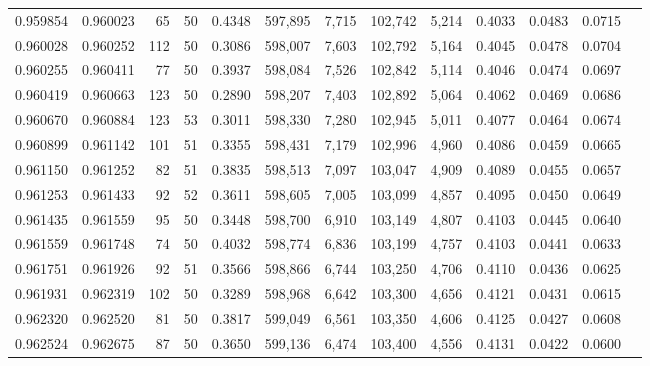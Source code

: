 \begin{tabular}{rrrrrrrrrrrrr}
0.959854 & 0.960023 &    65 &  50 &                                     0.4348 & 597,895 &   7,715 & 102,742 &   5,214 & 0.4033 & 0.0483 & 0.0715 \\
0.960028 & 0.960252 &   112 &  50 &                                     0.3086 & 598,007 &   7,603 & 102,792 &   5,164 & 0.4045 & 0.0478 & 0.0704 \\
0.960255 & 0.960411 &    77 &  50 &                                     0.3937 & 598,084 &   7,526 & 102,842 &   5,114 & 0.4046 & 0.0474 & 0.0697 \\
0.960419 & 0.960663 &   123 &  50 &                                     0.2890 & 598,207 &   7,403 & 102,892 &   5,064 & 0.4062 & 0.0469 & 0.0686 \\
0.960670 & 0.960884 &   123 &  53 &                                     0.3011 & 598,330 &   7,280 & 102,945 &   5,011 & 0.4077 & 0.0464 & 0.0674 \\
0.960899 & 0.961142 &   101 &  51 &                                     0.3355 & 598,431 &   7,179 & 102,996 &   4,960 & 0.4086 & 0.0459 & 0.0665 \\
0.961150 & 0.961252 &    82 &  51 &                                     0.3835 & 598,513 &   7,097 & 103,047 &   4,909 & 0.4089 & 0.0455 & 0.0657 \\
0.961253 & 0.961433 &    92 &  52 &                                     0.3611 & 598,605 &   7,005 & 103,099 &   4,857 & 0.4095 & 0.0450 & 0.0649 \\
0.961435 & 0.961559 &    95 &  50 &                                     0.3448 & 598,700 &   6,910 & 103,149 &   4,807 & 0.4103 & 0.0445 & 0.0640 \\
0.961559 & 0.961748 &    74 &  50 &                                     0.4032 & 598,774 &   6,836 & 103,199 &   4,757 & 0.4103 & 0.0441 & 0.0633 \\
0.961751 & 0.961926 &    92 &  51 &                                     0.3566 & 598,866 &   6,744 & 103,250 &   4,706 & 0.4110 & 0.0436 & 0.0625 \\
0.961931 & 0.962319 &   102 &  50 &                                     0.3289 & 598,968 &   6,642 & 103,300 &   4,656 & 0.4121 & 0.0431 & 0.0615 \\
0.962320 & 0.962520 &    81 &  50 &                                     0.3817 & 599,049 &   6,561 & 103,350 &   4,606 & 0.4125 & 0.0427 & 0.0608 \\
0.962524 & 0.962675 &    87 &  50 &                                     0.3650 & 599,136 &   6,474 & 103,400 &   4,556 & 0.4131 & 0.0422 & 0.0600 \\

\end{tabular}
